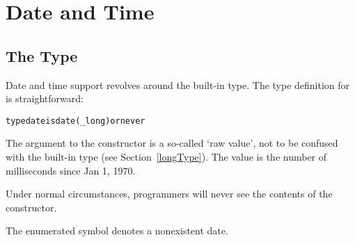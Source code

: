 \chapter{Date and Time}
\label{dateAndTime}

\section{The  Type}
Date and time support revolves around the  built-in type. The type definition for  is straightforward:

\begin{alltt}
type date is date(\_long) or never
\end{alltt}

\begin{aside}
The  argument to the constructor is a so-called `raw value', not to be confused with the  built-in type (see Section~\vref{longType}). The  value is the number of milliseconds since Jan 1, 1970.

Under normal circumstances, programmers will never see the contents of the  constructor.
\end{aside}

The  enumerated symbol denotes a nonexistent date.

